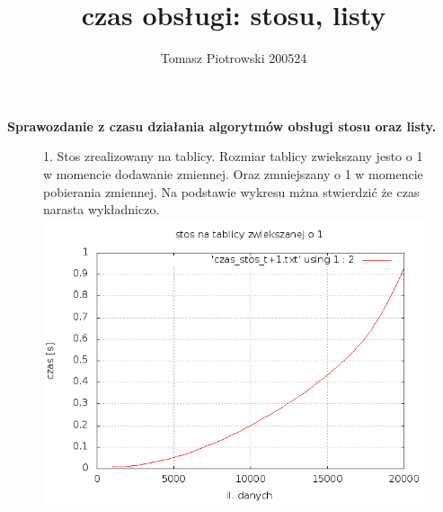 \documentclass[a4paper,11pt]{report}
\title{czas obsługi: stosu, listy}
\author{Tomasz Piotrowski 200524}
\begin{document}
\maketitle

\textbf {\Large{ Sprawozdanie z czasu działania algorytmów  obsługi stosu oraz listy. }}



\begin{figure}
  \begin{center}
  1. Stos zrealizowany na tablicy. Rozmiar tablicy zwiekszany jesto o 1 w momencie dodawanie zmiennej. Oraz zmniejszany o 1 w momencie pobierania zmiennej. Na podstawie wykresu mżna stwierdzić że czas narasta wykładniczo. 
    \includegraphics[scale=0.5]{./czas_stos_t+1.png}
    \label{fig:}
    \caption{}
  \end{center}
\end{figure}
\end{document}
